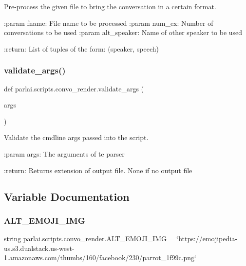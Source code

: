 \begin{DoxyVerb}Pre-process the given file to bring the conversation in a certain format.

:param fname: File name to be processed
:param num_ex: Number of conversations to be used
:param alt_speaker: Name of other speaker to be used

:return: List of tuples of the form: (speaker, speech)
\end{DoxyVerb}
 \mbox{\label{namespaceparlai_1_1scripts_1_1convo__render_a4078a037f4f5526297e7860fbed9cfb2}} 
\subsubsection{\texorpdfstring{validate\+\_\+args()}{validate\_args()}}
{\footnotesize\ttfamily def parlai.\+scripts.\+convo\+\_\+render.\+validate\+\_\+args (\begin{DoxyParamCaption}\item[{}]{args }\end{DoxyParamCaption})}

\begin{DoxyVerb}Validate the cmdline args passed into the script.

:param args: The arguments of te parser

:return: Returns extension of output file. None if no output file
\end{DoxyVerb}
 

\subsection{Variable Documentation}
\mbox{\label{namespaceparlai_1_1scripts_1_1convo__render_a857bb24c69ad3368ee6d8d1f3f389420}} 
\subsubsection{\texorpdfstring{A\+L\+T\+\_\+\+E\+M\+O\+J\+I\+\_\+\+I\+MG}{ALT\_EMOJI\_IMG}}
{\footnotesize\ttfamily string parlai.\+scripts.\+convo\+\_\+render.\+A\+L\+T\+\_\+\+E\+M\+O\+J\+I\+\_\+\+I\+MG = \char`\"{}https\+://emojipedia-\/us.\+s3.\+dualstack.\+us-\/west-\/1.amazonaws.\+com/thumbs/160/facebook/230/parrot\+\_\+1f99c.\+png\char`\"{}}

